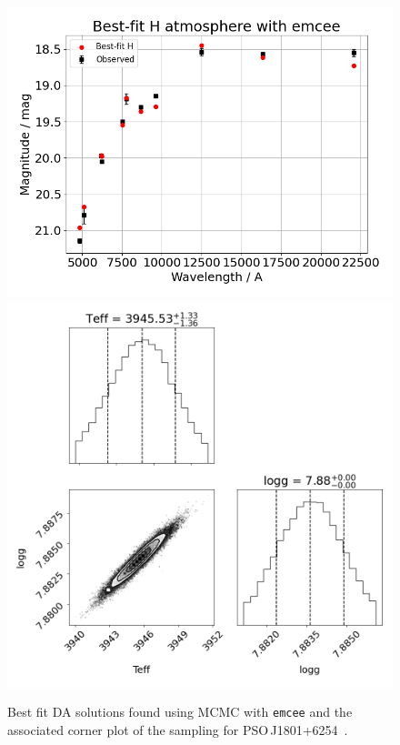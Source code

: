 \documentclass[fleqn,usenatbib]{rasti}
\begin{document}
\begin{figure}
    \centering
    \includegraphics[width=\columnwidth]{fig_02_PSOJ1801p6254_emcee.png}
    \includegraphics[width=\columnwidth]{fig_02_PSOJ1801p6254_emcee_corner.png}
    \caption{Best fit DA solutions found using MCMC with \texttt{emcee} and the associated corner plot of the
    sampling for PSO\,J1801+6254~\citep[][they found a spectroscopic of T$_\mathrm{eff}=3550$\,K]{2020MNRAS.493.6001L}.}
    \label{fig:best_fit}
\end{figure}
\end{document}
